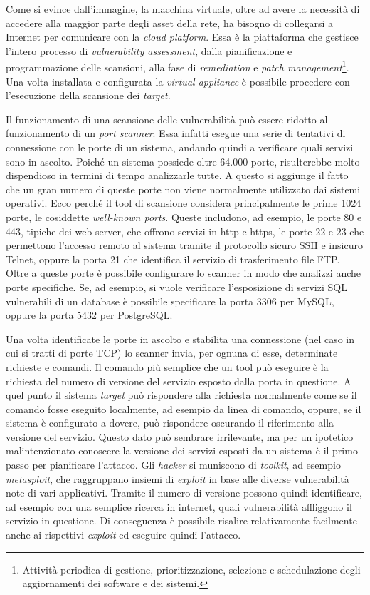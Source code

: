 \documentclass[target=mst,aauheader=]{thud}
\begin{document}
Come si evince dall’immagine, la macchina virtuale, oltre ad avere la necessità di accedere alla maggior parte degli asset della rete, ha bisogno di collegarsi a Internet per comunicare con la \textit{cloud platform}. Essa è la piattaforma che gestisce l’intero processo di \textit{vulnerability assessment}, dalla pianificazione e programmazione delle scansioni, alla fase di \textit{remediation} e \textit{patch management}\footnote{Attività periodica di gestione, prioritizzazione, selezione e schedulazione degli aggiornamenti dei software e dei sistemi.}. Una volta installata e configurata la \textit{virtual appliance} è possibile procedere con l’esecuzione della scansione dei \textit{target}.

Il funzionamento di una scansione delle vulnerabilità può essere ridotto al funzionamento di un \textit{port scanner}. Essa infatti esegue una serie di tentativi di connessione con le porte di un sistema, andando quindi a verificare quali servizi sono in ascolto. Poiché un sistema possiede oltre 64.000 porte, risulterebbe molto dispendioso in termini di tempo analizzarle tutte. A questo si aggiunge il fatto che un gran numero di queste porte non viene normalmente utilizzato dai sistemi operativi. Ecco perché il tool di scansione considera principalmente le prime 1024 porte, le cosiddette \textit{well-known ports}. Queste includono, ad esempio, le porte 80 e 443, tipiche dei web server, che offrono servizi in http e https, le porte 22 e 23 che permettono l’accesso remoto al sistema tramite il protocollo sicuro SSH e insicuro Telnet, oppure la porta 21 che identifica il servizio di trasferimento file FTP. Oltre a queste porte è possibile configurare lo scanner in modo che analizzi anche porte specifiche. Se, ad esempio, si vuole verificare l’esposizione di servizi SQL vulnerabili di un database è possibile specificare la porta 3306 per MySQL, oppure la porta 5432 per PostgreSQL.

Una volta identificate le porte in ascolto e stabilita una connessione (nel caso in cui si tratti di porte TCP) lo scanner invia, per ognuna di esse, determinate richieste e comandi. Il comando più semplice che un tool può eseguire è la richiesta del numero di versione del servizio esposto dalla porta in questione. A quel punto il sistema \textit{target} può rispondere alla richiesta normalmente come se il comando fosse eseguito localmente, ad esempio da linea di comando, oppure, se il sistema è configurato a dovere, può rispondere oscurando il riferimento alla versione del servizio. Questo dato può sembrare irrilevante, ma per un ipotetico malintenzionato conoscere la versione dei servizi esposti da un sistema è il primo passo per pianificare l’attacco. Gli \textit{hacker} si muniscono di \textit{toolkit}, ad esempio \textit{metasploit}, che raggruppano insiemi di \textit{exploit} in base alle diverse vulnerabilità note di vari applicativi. Tramite il numero di versione possono quindi identificare, ad esempio con una semplice ricerca in internet, quali vulnerabilità affliggono il servizio in questione. Di conseguenza è possibile risalire relativamente facilmente anche ai rispettivi \textit{exploit} ed eseguire quindi l’attacco.
\end{document}
